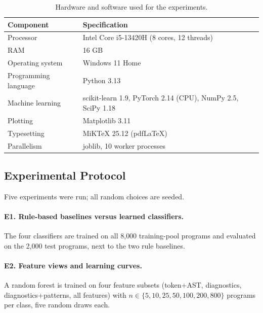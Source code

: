\documentclass[conference]{IEEEtran}
\begin{document}
\begin{table}[t]
\centering
\caption{Hardware and software used for the experiments.}
\label{tab:sysreq}
\begin{tabular}{lp{5.4cm}}
\toprule
\textbf{Component} & \textbf{Specification}\\
\midrule
Processor & Intel Core i5-13420H (8 cores, 12 threads)\\
RAM & 16 GB\\
Operating system & Windows 11 Home\\
Programming language & Python 3.13\\
Machine learning & scikit-learn 1.9, PyTorch 2.14 (CPU), NumPy 2.5, SciPy 1.18\\
Plotting & Matplotlib 3.11\\
Typesetting & MiKTeX 25.12 (pdfLaTeX)\\
Parallelism & joblib, 10 worker processes\\
\bottomrule
\end{tabular}
\end{table}

\subsection{Experimental Protocol}

Five experiments were run; all random choices are seeded.

\paragraph{E1. Rule-based baselines versus learned classifiers.} The four classifiers are trained on all
8{,}000 training-pool programs and evaluated on the 2{,}000 test programs, next to the two rule baselines.

\paragraph{E2. Feature views and learning curves.} A random forest is trained on four feature subsets
(token+AST, diagnostics, diagnostics+patterns, all features) with $n\in\{5,10,25,50,100,200,800\}$ programs per class,
five random draws each.
\end{document}
